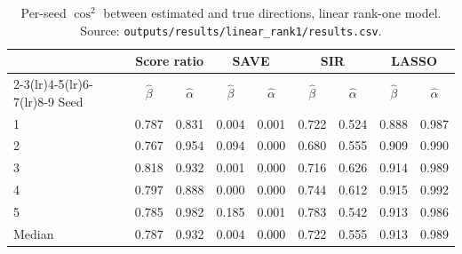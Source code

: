 \begin{table}[h]
\centering
\caption{Per-seed $\cos^2$ between estimated and true directions, linear rank-one model. Source: \texttt{outputs/results/linear\_rank1/results.csv}.}
\label{tab:linear_rank1_seeds}
\small
\begin{tabular}{lcccccccc}
\toprule
 & \multicolumn{2}{c}{Score ratio} & \multicolumn{2}{c}{SAVE} & \multicolumn{2}{c}{SIR} & \multicolumn{2}{c}{LASSO}\\
\cmidrule(lr){2-3}\cmidrule(lr){4-5}\cmidrule(lr){6-7}\cmidrule(lr){8-9}
Seed & $\hat\beta$ & $\hat\alpha$ & $\hat\beta$ & $\hat\alpha$ & $\hat\beta$ & $\hat\alpha$ & $\hat\beta$ & $\hat\alpha$\\
\midrule
1 & 0.787 & 0.831 & 0.004 & 0.001 & 0.722 & 0.524 & 0.888 & 0.987\\
2 & 0.767 & 0.954 & 0.094 & 0.000 & 0.680 & 0.555 & 0.909 & 0.990\\
3 & 0.818 & 0.932 & 0.001 & 0.000 & 0.716 & 0.626 & 0.914 & 0.989\\
4 & 0.797 & 0.888 & 0.000 & 0.000 & 0.744 & 0.612 & 0.915 & 0.992\\
5 & 0.785 & 0.982 & 0.185 & 0.001 & 0.783 & 0.542 & 0.913 & 0.986\\
\midrule
Median & 0.787 & 0.932 & 0.004 & 0.000 & 0.722 & 0.555 & 0.913 & 0.989\\
\bottomrule
\end{tabular}
\end{table}

